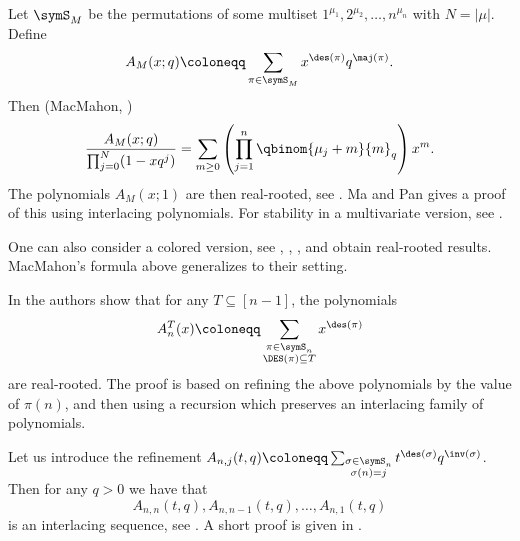 \begin{example*}
Let $\symS_M$ be the permutations of some multiset $1^{\mu_1},2^{\mu_2},\dotsc,n^{\mu_n}$ with $N=|\mu|$.
Define
\[
 A_M(x;q) \coloneqq  \sum_{\pi \in \symS_M } x^{\des(\pi)}q^{\maj(\pi)}.
\]
Then (MacMahon, \cite{MacMahon1960})
\[
 \frac{A_M(x;q)}{\prod_{j=0}^N (1-x q^j)} = \sum_{m \geq 0} \left(\prod_{j=1}^n \qbinom{\mu_j+m}{m}_q \right) x^m.
\]
The polynomials $A_M(x;1)$ are then real-rooted, see \cite[Section 2]{Simion1984}.
Ma and Pan \cite[Thm. 1.11]{MaPan2023} gives a proof of this using interlacing polynomials.
For stability in a multivariate version, see \cite[Eq. (4.7)]{BrandenHaglundVisontaiWagner2011}.

One can also consider a colored version, see , , ,
and obtain real-rooted results.
MacMahon's formula above generalizes to their setting.
\end{example*}



\begin{example*}
In \cite{AthanasiadisEvangelinou2023xII} the authors show that for any $T \subseteq [n-1]$,
the polynomials
\[
 A_n^T(x) \coloneqq  \sum_{\substack{\pi \in \symS_n \\ \DES(\pi) \subseteq T}} x^{\des(\pi)}
\]
are real-rooted. The proof is based on refining the above polynomials
by the value of $\pi(n)$, and then using a recursion which preserves an interlacing
family of polynomials.
\end{example*}


\begin{example*}

Let us introduce the refinement $A_{n,j}(t,q) \coloneqq \sum_{\substack{\sigma \in \symS_n \\ \sigma(n)=j}} t^{\des(\sigma)} q^{\inv(\sigma)}$.
Then for any $q \gt 0$ we have that
\[
 A_{n,n}(t,q), A_{n,n-1}(t,q), \dotsc, A_{n,1}(t,q)
\]
is an interlacing sequence, see \cite{SavageVisontai2015}.
A short proof is given in \cite{AthanasiadisEvangelinou2023x}.
\end{example*}


